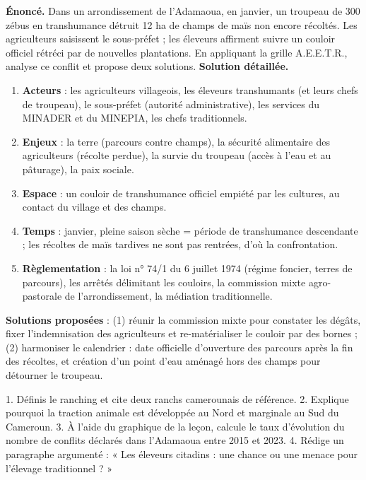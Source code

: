 \documentclass[11pt]{article}
\begin{document}
\begin{exoresolu}
\textbf{Énoncé.} Dans un arrondissement de l'Adamaoua, en janvier, un troupeau de 300 zébus en transhumance détruit 12 ha de champs de maïs non encore récoltés. Les agriculteurs saisissent le sous-préfet ; les éleveurs affirment suivre un couloir officiel rétréci par de nouvelles plantations. En appliquant la grille A.E.E.T.R., analyse ce conflit et propose deux solutions.
\tcblower
\textbf{Solution détaillée.}
\begin{enumerate}
\item \textbf{Acteurs} : les agriculteurs villageois, les éleveurs transhumants (et leurs chefs de troupeau), le sous-préfet (autorité administrative), les services du MINADER et du MINEPIA, les chefs traditionnels.
\item \textbf{Enjeux} : la terre (parcours contre champs), la sécurité alimentaire des agriculteurs (récolte perdue), la survie du troupeau (accès à l'eau et au pâturage), la paix sociale.
\item \textbf{Espace} : un couloir de transhumance officiel empiété par les cultures, au contact du village et des champs.
\item \textbf{Temps} : janvier, pleine saison sèche = période de transhumance descendante ; les récoltes de maïs tardives ne sont pas rentrées, d'où la confrontation.
\item \textbf{Règlementation} : la loi n° 74/1 du 6 juillet 1974 (régime foncier, terres de parcours), les arrêtés délimitant les couloirs, la commission mixte agro-pastorale de l'arrondissement, la médiation traditionnelle.
\end{enumerate}
\textbf{Solutions proposées} : (1) réunir la commission mixte pour constater les dégâts, fixer l'indemnisation des agriculteurs et re-matérialiser le couloir par des bornes ; (2) harmoniser le calendrier : date officielle d'ouverture des parcours après la fin des récoltes, et création d'un point d'eau aménagé hors des champs pour détourner le troupeau.
\end{exoresolu}

\begin{exercice}[À faire]
1. Définis le ranching et cite deux ranchs camerounais de référence.
2. Explique pourquoi la traction animale est développée au Nord et marginale au Sud du Cameroun.
3. À l'aide du graphique de la leçon, calcule le taux d'évolution du nombre de conflits déclarés dans l'Adamaoua entre 2015 et 2023.
4. Rédige un paragraphe argumenté : « Les éleveurs citadins : une chance ou une menace pour l'élevage traditionnel ? »
\end{exercice}
\end{document}

